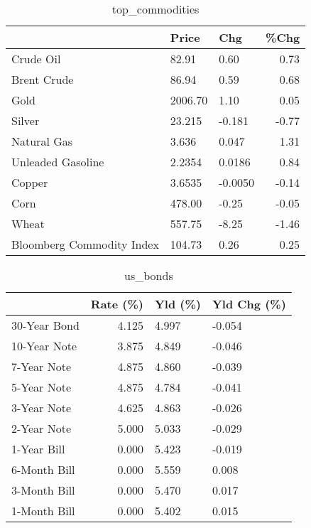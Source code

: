 \documentclass{article}%
\begin{document}
\begin{table}[htbp]%
\caption{top\_commodities}%
\centering%
\begin{adjustbox}{width=1\textwidth}%
\begin{tabular}{lllr}
\toprule
                          &   Price &     Chg &  \%Chg \\
\midrule
               Crude Oil  &   82.91 &    0.60 &  0.73 \\
             Brent Crude  &   86.94 &    0.59 &  0.68 \\
                    Gold  & 2006.70 &    1.10 &  0.05 \\
                  Silver  &  23.215 &  -0.181 & -0.77 \\
             Natural Gas  &   3.636 &   0.047 &  1.31 \\
       Unleaded Gasoline  &  2.2354 &  0.0186 &  0.84 \\
                  Copper  &  3.6535 & -0.0050 & -0.14 \\
                    Corn  &  478.00 &   -0.25 & -0.05 \\
                   Wheat  &  557.75 &   -8.25 & -1.46 \\
Bloomberg Commodity Index &  104.73 &    0.26 &  0.25 \\
\bottomrule
\end{tabular}
%
\end{adjustbox}%
\end{table}

%


\begin{table}[htbp]%
\caption{us\_bonds}%
\centering%
\begin{adjustbox}{width=1\textwidth}%
\begin{tabular}{lrll}
\toprule
             &  Rate (\%) & Yld (\%) & Yld Chg (\%) \\
\midrule
30-Year Bond &     4.125 &   4.997 &      -0.054 \\
10-Year Note &     3.875 &   4.849 &      -0.046 \\
 7-Year Note &     4.875 &   4.860 &      -0.039 \\
 5-Year Note &     4.875 &   4.784 &      -0.041 \\
 3-Year Note &     4.625 &   4.863 &      -0.026 \\
 2-Year Note &     5.000 &   5.033 &      -0.029 \\
 1-Year Bill &     0.000 &   5.423 &      -0.019 \\
6-Month Bill &     0.000 &   5.559 &       0.008 \\
3-Month Bill &     0.000 &   5.470 &       0.017 \\
1-Month Bill &     0.000 &   5.402 &       0.015 \\
\bottomrule
\end{tabular}
%
\end{adjustbox}%
\end{table}
\end{document}

